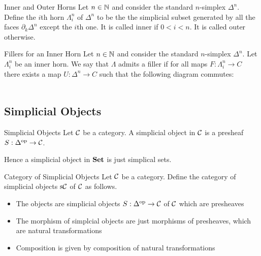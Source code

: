 \documentclass[a4paper]{article}
\begin{document}
\begin{defn}{Inner and Outer Horns}{} Let $n\in\mathbb{N}$ and consider the standard $n$-simplex $\Delta^n$. Define the $i$th horn $\Lambda_i^n$ of $\Delta^n$ to be the the simplicial subset generated by all the faces $\partial_k\Delta^n$ except the $i$th one. It is called inner if $0<i<n$. It is called outer otherwise. 
\end{defn}

\begin{defn}{Fillers for an Inner Horn}{} Let $n\in\mathbb{N}$ and consider the standard $n$-simplex $\Delta^n$. Let $\Lambda_i^n$ be an inner horn. We say that $\Lambda$ admits a filler if for all maps $F:\Lambda_i^n\to C$ there exists a map $U:\Delta^n\to C$ such that the following diagram commutes: \\~\\
\end{defn}

\subsection{Simplicial Objects}
\begin{defn}{Simplicial Objects}{} Let $\mathcal{C}$ be a category. A simplicial object in $\mathcal{C}$ is a presheaf $S:\Delta^\text{op}\to\mathcal{C}$. 
\end{defn}

Hence a simplicial object in $\bold{Set}$ is just simplical sets. 

\begin{defn}{Category of Simplicial Objects}{} Let $\mathcal{C}$ be a category. Define the category of simplicial objects $\text{s}\mathcal{C}$ of $\mathcal{C}$ as follows. 
\begin{itemize}
\item The objects are simplicial objects $S:\Delta^\text{op}\to\mathcal{C}$ of $\mathcal{C}$ which are presheaves
\item The morphism of simplcial objects are just morphisms of presheaves, which are natural transformations
\item Composition is given by composition of natural transformations
\end{itemize}
\end{defn}
\end{document}
